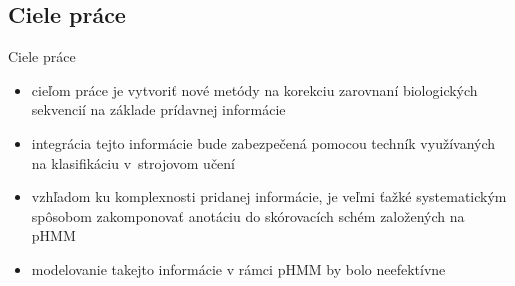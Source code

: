 \documentclass[xcolor=dvipsnames, compress, 12pt]{beamer}
\theoremstyle{definition}
\newtheorem{df}[vt]{Definícia}
\begin{document}

\subsection{Ciele práce}
\begin{frame}{Ciele práce}
  \begin{itemize}
  \item cieľom práce je vytvoriť nové metódy na korekciu zarovnaní biologických sekvencií na základe prídavnej informácie
  \item integrácia tejto informácie bude zabezpečená pomocou techník využívaných na klasifikáciu v~strojovom učení
  \end{itemize}
  \vspace{.5cm}
  \pause
  \begin{itemize}
  \item vzhľadom ku komplexnosti pridanej informácie, je veľmi ťažké systematickým spôsobom zakomponovať anotáciu do skórovacích schém založených na pHMM
  \item modelovanie takejto informácie v rámci pHMM by bolo neefektívne
  \end{itemize}
\end{frame}
\end{document}
